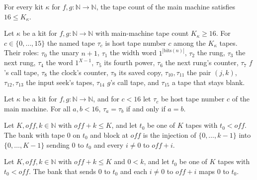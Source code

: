\begin{theorem}
\label{Turing.NTimeDiag.QyKit.le_K}
\leanok
{}
For every kit $\kappa$ for $f, g : \mathbb{N} \to \mathbb{N}$, the tape count of the main machine
satisfies $16 \le K_\kappa$.
\end{theorem}

\begin{definition}
\label{Turing.NTimeDiag.QyKit.tp}
\leanok
{}
Let $\kappa$ be a kit for $f, g : \mathbb{N} \to \mathbb{N}$ with main-machine tape count
$K_\kappa \ge 16$. For $c \in \{0, \dots, 15\}$ the named tape $\tau_c$ is host tape number $c$
among the $K_\kappa$ tapes. Their roles: $\tau_0$ the unary $n + 1$, $\tau_1$ the width word
$1^{|\mathrm{bits}(n)|}$, $\tau_2$ the rung, $\tau_3$ the next rung, $\tau_4$ the word $1^{X-1}$,
$\tau_5$ its fourth power, $\tau_6$ the next rung's counter, $\tau_7$ $f$'s call tape, $\tau_8$ the
clock's counter, $\tau_9$ its saved copy, $\tau_{10}, \tau_{11}$ the pair $(j, k)$, $\tau_{12},
\tau_{13}$ the input seek's tapes, $\tau_{14}$ $g$'s call tape, and $\tau_{15}$ a tape that stays
blank.
\end{definition}

\begin{theorem}
\label{Turing.NTimeDiag.QyKit.tp_inj}
\leanok
{}
Let $\kappa$ be a kit for $f, g : \mathbb{N} \to \mathbb{N}$, and for $c < 16$ let $\tau_c$ be host
tape number $c$ of the main machine. For all $a, b < 16$, $\tau_a = \tau_b$ if and only if $a = b$.
\end{theorem}

\begin{definition}
\label{Turing.NTimeDiag.qyBank}
\leanok
Let $K, \mathit{off}, k \in \mathbb{N}$ with $\mathit{off} + k \le K$, and let $t_0$ be one of $K$
tapes with $t_0 < \mathit{off}$. The bank with tape $0$ on $t_0$ and block at $\mathit{off}$ is the
injection of $\{0, \dots, k-1\}$ into $\{0, \dots, K-1\}$ sending $0$ to $t_0$ and every $i \ne 0$
to $\mathit{off} + i$.
\end{definition}

\begin{theorem}
\label{Turing.NTimeDiag.qyBank_zero}
\leanok
{}
Let $K, \mathit{off}, k \in \mathbb{N}$ with $\mathit{off} + k \le K$ and $0 < k$, and let $t_0$ be
one of $K$ tapes with $t_0 < \mathit{off}$. The bank that sends $0$ to $t_0$ and each $i \ne 0$ to
$\mathit{off} + i$ maps $0$ to $t_0$.
\end{theorem}

